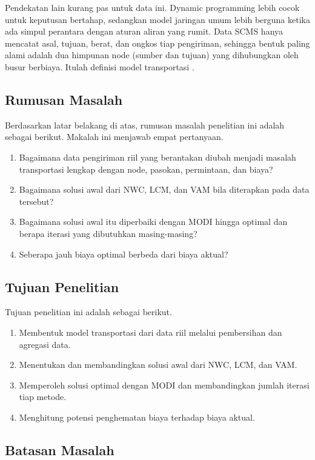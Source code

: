 \documentclass[a4paper,11pt]{article}
\begin{document}
Pendekatan lain kurang pas untuk data ini. Dynamic programming lebih cocok untuk keputusan bertahap, sedangkan model jaringan umum lebih berguna ketika ada simpul perantara dengan aturan aliran yang rumit. Data SCMS hanya mencatat asal, tujuan, berat, dan ongkos tiap pengiriman, sehingga bentuk paling alami adalah dua himpunan node (sumber dan tujuan) yang dihubungkan oleh busur berbiaya. Itulah definisi model transportasi \cite{amaliah2022a,karagul2020}.

\subsection{Rumusan Masalah}
Berdasarkan latar belakang di atas, rumusan masalah penelitian ini adalah sebagai berikut. Makalah ini menjawab empat pertanyaan.
\begin{enumerate}
  \item Bagaimana data pengiriman riil yang berantakan diubah menjadi masalah transportasi lengkap dengan node, pasokan, permintaan, dan biaya?
  \item Bagaimana solusi awal dari NWC, LCM, dan VAM bila diterapkan pada data tersebut?
  \item Bagaimana solusi awal itu diperbaiki dengan MODI hingga optimal dan berapa iterasi yang dibutuhkan masing-masing?
  \item Seberapa jauh biaya optimal berbeda dari biaya aktual?
\end{enumerate}

\subsection{Tujuan Penelitian}
Tujuan penelitian ini adalah sebagai berikut.
\begin{enumerate}
  \item Membentuk model transportasi dari data riil melalui pembersihan dan agregasi data.
  \item Menentukan dan membandingkan solusi awal dari NWC, LCM, dan VAM.
  \item Memperoleh solusi optimal dengan MODI dan membandingkan jumlah iterasi tiap metode.
  \item Menghitung potensi penghematan biaya terhadap biaya aktual.
\end{enumerate}

\subsection{Batasan Masalah}
\end{document}
